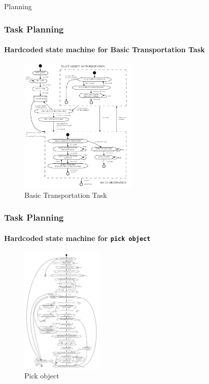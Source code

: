 \documentclass{beamer}
\begin{document}
\begin{frame}[standout]
     Planning
\end{frame}

\begin{frame}
\frametitle{Task Planning}
\framesubtitle{Hardcoded state machine for Basic Transportation Task}
\begin{figure}[H]
     \centering
     \includegraphics[width=0.5\textwidth]{images/BTT.png}
     \caption{Basic Transportation Task~\cite{Lima}}
     \label{fig:btt}
\end{figure}
\end{frame}

\begin{frame}
\frametitle{Task Planning}
\framesubtitle{Hardcoded state machine for \texttt{pick object}}
\begin{figure}[H]
     \centering
     \includegraphics[width=0.35\textwidth]{images/Pick.png}
     \caption{Pick object~\cite{Lima}}
     \label{fig:pick}
\end{figure}
\end{frame}
\end{document}
